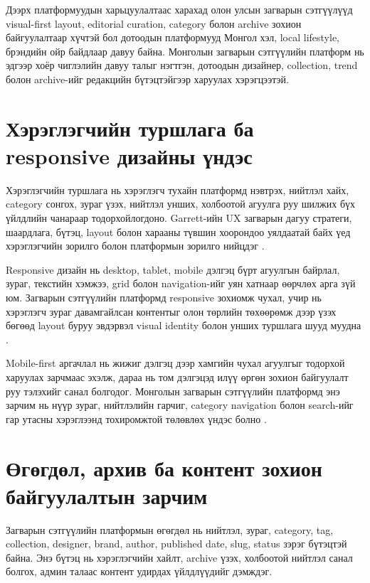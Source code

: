 Дээрх платформуудын харьцуулалтаас харахад олон улсын загварын сэтгүүлүүд visual-first layout, editorial curation, category болон archive зохион байгуулалтаар хүчтэй бол дотоодын платформууд Монгол хэл, local lifestyle, брэндийн ойр байдлаар давуу байна. Монголын загварын сэтгүүлийн платформ нь эдгээр хоёр чиглэлийн давуу талыг нэгтгэн, дотоодын дизайнер, collection, trend болон archive-ийг редакцийн бүтэцтэйгээр харуулах хэрэгцээтэй.

\section{Хэрэглэгчийн туршлага ба responsive дизайны үндэс}

Хэрэглэгчийн туршлага нь хэрэглэгч тухайн платформд нэвтрэх, нийтлэл хайх, category сонгох, зураг үзэх, нийтлэл унших, холбоотой агуулга руу шилжих бүх үйлдлийн чанараар тодорхойлогдоно. Garrett-ийн UX загварын дагуу стратеги, шаардлага, бүтэц, layout болон харааны түвшин хоорондоо уялдаатай байх үед хэрэглэгчийн зорилго болон платформын зорилго нийцдэг \cite{garrett_uxe_2011}.

Responsive дизайн нь desktop, tablet, mobile дэлгэц бүрт агуулгын байрлал, зураг, текстийн хэмжээ, grid болон navigation-ийг уян хатнаар өөрчлөх арга зүй юм. Загварын сэтгүүлийн платформд responsive зохиомж чухал, учир нь хэрэглэгч зураг давамгайлсан контентыг олон төрлийн төхөөрөмж дээр үзэх бөгөөд layout буруу эвдэрвэл visual identity болон унших туршлага шууд муудна \cite{marcotte_rwd_2011}.

Mobile-first аргачлал нь жижиг дэлгэц дээр хамгийн чухал агуулгыг тодорхой харуулах зарчмаас эхэлж, дараа нь том дэлгэцэд илүү өргөн зохион байгуулалт руу тэлэхийг санал болгодог. Монголын загварын сэтгүүлийн платформд энэ зарчим нь нүүр зураг, нийтлэлийн гарчиг, category navigation болон search-ийг гар утасны хэрэглээнд тохиромжтой төлөвлөх үндэс болно \cite{wroblewski_mobile_first_2011}.

\section{Өгөгдөл, архив ба контент зохион байгуулалтын зарчим}

Загварын сэтгүүлийн платформын өгөгдөл нь нийтлэл, зураг, category, tag, collection, designer, brand, author, published date, slug, status зэрэг бүтэцтэй байна. Энэ бүтэц нь хэрэглэгчийн хайлт, archive үзэх, холбоотой нийтлэл санал болгох, админ талаас контент удирдах үйлдлүүдийг дэмждэг.

